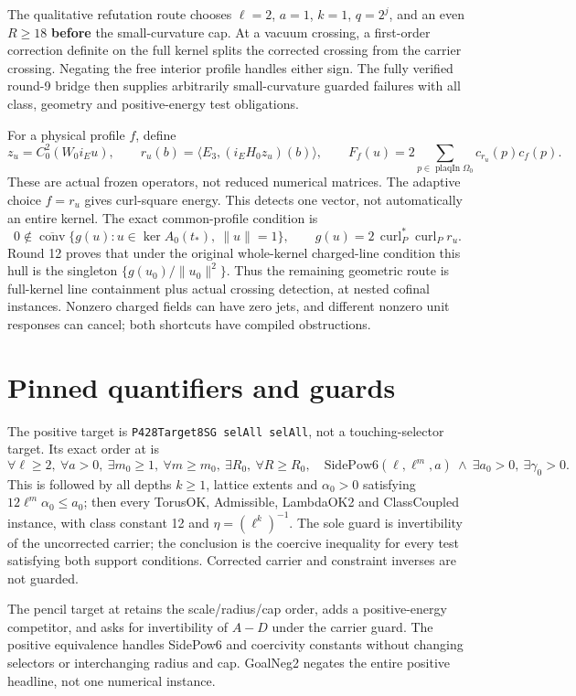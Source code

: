 The qualitative refutation route chooses \(\ell=2\), \(a=1\), \(k=1\), \(q=2^j\), and an even \(R\ge18\) \textbf{before} the small-curvature cap. At a vacuum crossing, a first-order correction definite on the full kernel splits the corrected crossing from the carrier crossing. Negating the free interior profile handles either sign. The fully verified round-9 bridge then supplies arbitrarily small-curvature guarded failures with all class, geometry and positive-energy test obligations.

For a physical profile \(f\), define
\[
 z_u=C^2_0(W_0i_Eu),\qquad r_u(b)=\langle E_3,(i_EH_0z_u)(b)\rangle,
 \qquad F_f(u)=2\sum_{p\in\operatorname{plaqIn}\Omega_0}c_{r_u}(p)c_f(p).
\]
These are actual frozen operators, not reduced numerical matrices. The adaptive choice \(f=r_u\) gives curl-square energy. This detects one vector, not automatically an entire kernel. The exact common-profile condition is
\[
0\notin\overline{\operatorname{conv}}\{g(u):u\in\ker A_0(t_*),\ \|u\|=1\},
\qquad g(u)=2\,\operatorname{curl}_P^*\operatorname{curl}_P r_u.
\]
Round 12 proves that under the original whole-kernel charged-line condition this hull is the singleton \(\{g(u_0)/\|u_0\|^2\}\). Thus the remaining geometric route is full-kernel line containment plus actual crossing detection, at nested cofinal instances. Nonzero charged fields can have zero jets, and different nonzero unit responses can cancel; both shortcuts have compiled obstructions.

\section{Pinned quantifiers and guards}
The positive target is \texttt{P428Target8SG selAll selAll}, not a touching-selector target. Its exact order at \texttt{} is
\[
\forall \ell\ge2,\ \forall a>0,\ \exists m_0\ge1,\ \forall m\ge m_0,\ \exists R_0,\ \forall R\ge R_0,
\quad \mathrm{SidePow6}(\ell,\ell^m,a)\ \land\ \exists a_0>0,\ \exists\gamma_0>0.
\]
This is followed by all depths \(k\ge1\), lattice extents and \(\alpha_0>0\) satisfying \(12\ell^m\alpha_0\le a_0\); then every TorusOK, Admissible, LambdaOK2 and ClassCoupled instance, with class constant 12 and \(\eta=(\ell^k)^{-1}\). The sole guard is invertibility of the uncorrected carrier; the conclusion is the coercive inequality for every test satisfying both support conditions. Corrected carrier and constraint inverses are not guarded.

The pencil target at \texttt{} retains the scale/radius/cap order, adds a positive-energy competitor, and asks for invertibility of \(A-D\) under the carrier guard. The positive equivalence handles SidePow6 and coercivity constants without changing selectors or interchanging radius and cap. GoalNeg2 negates the entire positive headline, not one numerical instance.

